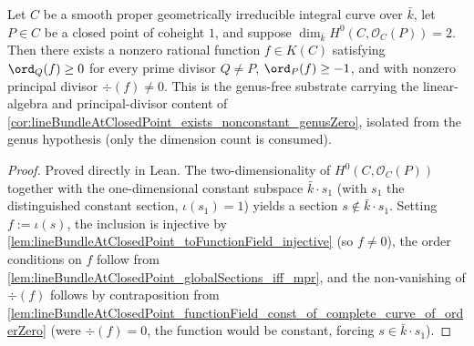 \begin{theorem}\leanok
[Existence of a non-constant rational function from
\(\dim H^0 = 2\)]
  \label{thm:lineBundleAtClosedPoint_exists_nonconstant_rational_from_dim_eq_two}
  Let \(C\) be a smooth proper geometrically irreducible integral curve over
  \(\bar k\), let \(P \in C\) be a closed point of coheight \(1\), and suppose
  \(\dim_{\bar k} H^0(C, \mathcal O_C(P)) = 2\). Then there exists a nonzero
  rational function \(f \in K(C)\) satisfying \(\ord_Q(f) \ge 0\) for every
  prime divisor \(Q \ne P\), \(\ord_P(f) \ge -1\), and with nonzero principal
  divisor \(\div(f) \ne 0\). This is the genus-free substrate carrying the
  linear-algebra and principal-divisor content of
  \cref{cor:lineBundleAtClosedPoint_exists_nonconstant_genusZero}, isolated
  from the genus hypothesis (only the dimension count is consumed).
\end{theorem}

\begin{proof}
  Proved directly in Lean. The two-dimensionality of
  \(H^0(C, \mathcal O_C(P))\) together with the one-dimensional constant
  subspace \(\bar k \cdot s_1\) (with \(s_1\) the distinguished constant
  section, \(\iota(s_1) = 1\)) yields a section \(s \notin \bar k \cdot s_1\).
  Setting \(f := \iota(s)\), the inclusion is injective by
  \cref{lem:lineBundleAtClosedPoint_toFunctionField_injective} (so
  \(f \ne 0\)), the order conditions on \(f\) follow from
  \cref{lem:lineBundleAtClosedPoint_globalSections_iff_mpr}, and the
  non-vanishing of \(\div(f)\) follows by contraposition from
  \cref{lem:lineBundleAtClosedPoint_functionField_const_of_complete_curve_of_orderZero}
  (were \(\div(f) = 0\), the function would be constant, forcing
  \(s \in \bar k \cdot s_1\)).
\end{proof}

